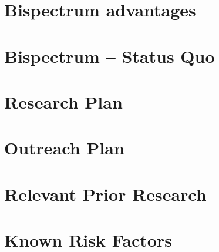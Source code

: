 \section{Bispectrum advantages}





\section{Bispectrum -- Status Quo}

\section{Research Plan}

\section{Outreach Plan}

\section{Relevant Prior Research}

\section{Known Risk Factors}



